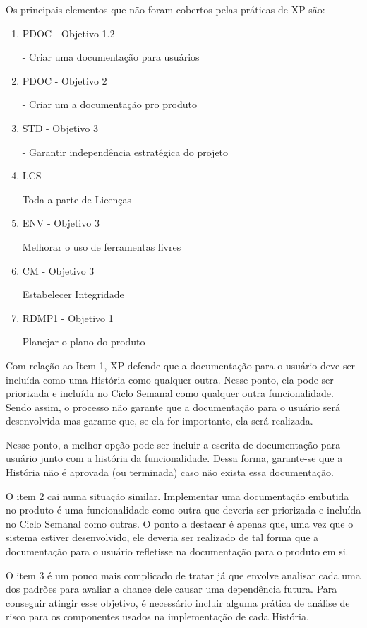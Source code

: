 Os principais elementos que não foram cobertos pelas práticas de XP
são:

\begin{enumerate}
\item PDOC - Objetivo 1.2

  - Criar uma documentação para usuários

\item PDOC - Objetivo 2

  - Criar um a documentação pro produto

\item STD - Objetivo 3

  - Garantir independência estratégica do projeto

\item LCS

  Toda a parte de Licenças

\item ENV - Objetivo 3

  Melhorar o uso de ferramentas livres

\item CM - Objetivo 3

  Estabelecer Integridade

\item RDMP1 - Objetivo 1

  Planejar o plano do produto
\end{enumerate}

Com relação ao Item 1, XP defende que a documentação para o usuário
deve ser incluída como uma História como qualquer outra. Nesse ponto,
ela pode ser priorizada e incluída no Ciclo Semanal como qualquer
outra funcionalidade. Sendo assim, o processo não garante que a
documentação para o usuário será desenvolvida mas garante que, se ela
for importante, ela será realizada.

Nesse ponto, a melhor opção pode ser incluir a escrita de documentação
para usuário junto com a história da funcionalidade. Dessa forma,
garante-se que a História não é aprovada (ou terminada) caso não
exista essa documentação.

O item 2 cai numa situação similar. Implementar uma documentação
embutida no produto é uma funcionalidade como outra que deveria ser
priorizada e incluída no Ciclo Semanal como outras. O ponto a destacar
é apenas que, uma vez que o sistema estiver desenvolvido, ele deveria
ser realizado de tal forma que a documentação para o usuário
refletisse na documentação para o produto em si.

O item 3 é um pouco mais complicado de tratar já que envolve analisar
cada uma dos padrões para avaliar a chance dele causar uma dependência
futura. Para conseguir atingir esse objetivo, é necessário incluir
alguma prática de análise de risco para os componentes usados na
implementação de cada História.

